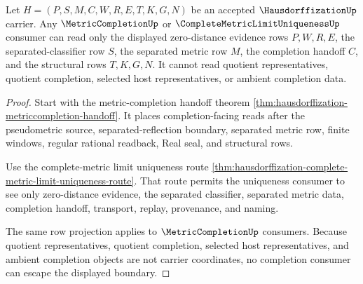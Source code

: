\begin{theorem}
\label{thm:hausdorffization-completion-consumer-nonescape}
Let $H=(P,S,M,C,W,R,E,T,K,G,N)$ be an accepted $\HausdorffizationUp$ carrier. Any $\MetricCompletionUp$ or $\CompleteMetricLimitUniquenessUp$ consumer can read only the displayed zero-distance evidence rows $P,W,R,E$, the separated-classifier row $S$, the separated metric row $M$, the completion handoff $C$, and the structural rows $T,K,G,N$. It cannot read quotient representatives, quotient completion, selected host representatives, or ambient completion data.
\end{theorem}
\begin{proof}
Start with the metric-completion handoff theorem \autoref{thm:hausdorffization-metriccompletion-handoff}. It places completion-facing reads after the pseudometric source, separated-reflection boundary, separated metric row, finite windows, regular rational readback, Real seal, and structural rows.

Use the complete-metric limit uniqueness route \autoref{thm:hausdorffization-complete-metric-limit-uniqueness-route}. That route permits the uniqueness consumer to see only zero-distance evidence, the separated classifier, separated metric data, completion handoff, transport, replay, provenance, and naming.

The same row projection applies to $\MetricCompletionUp$ consumers. Because quotient representatives, quotient completion, selected host representatives, and ambient completion objects are not carrier coordinates, no completion consumer can escape the displayed boundary.
\end{proof}

